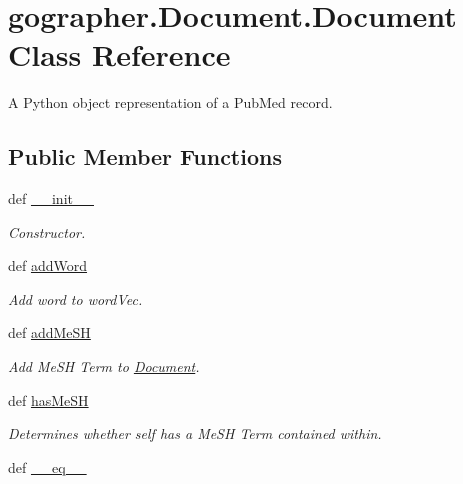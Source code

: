 \hypertarget{classgographer_1_1_document_1_1_document}{\section{gographer.\-Document.\-Document Class Reference}
\label{classgographer_1_1_document_1_1_document}
}


A Python object representation of a Pub\-Med record.  


\subsection*{Public Member Functions}
\begin{DoxyCompactItemize}
\item 
\hypertarget{classgographer_1_1_document_1_1_document_a2fd79ed107c0c6a191dc80dd51fe75f6}{def \hyperlink{classgographer_1_1_document_1_1_document_a2fd79ed107c0c6a191dc80dd51fe75f6}{\-\_\-\-\_\-init\-\_\-\-\_\-}}\label{classgographer_1_1_document_1_1_document_a2fd79ed107c0c6a191dc80dd51fe75f6}

\begin{DoxyCompactList}\small\item\em Constructor. \end{DoxyCompactList}\item 
def \hyperlink{classgographer_1_1_document_1_1_document_ac9d11f856218c07cda99bf2359b27ad2}{add\-Word}
\begin{DoxyCompactList}\small\item\em Add word to word\-Vec. \end{DoxyCompactList}\item 
def \hyperlink{classgographer_1_1_document_1_1_document_a889b1121d2341a508bbf7230c48267fd}{add\-Me\-S\-H}
\begin{DoxyCompactList}\small\item\em Add Me\-S\-H Term to \hyperlink{classgographer_1_1_document_1_1_document}{Document}. \end{DoxyCompactList}\item 
\hypertarget{classgographer_1_1_document_1_1_document_a6a75e7d644e2a18f23a79d5cb31451d1}{def \hyperlink{classgographer_1_1_document_1_1_document_a6a75e7d644e2a18f23a79d5cb31451d1}{has\-Me\-S\-H}}\label{classgographer_1_1_document_1_1_document_a6a75e7d644e2a18f23a79d5cb31451d1}

\begin{DoxyCompactList}\small\item\em Determines whether self has a Me\-S\-H Term contained within. \end{DoxyCompactList}\item 
\hypertarget{classgographer_1_1_document_1_1_document_a389cb58d2ec62dc83a9f2f6ecc5fb484}{def \hyperlink{classgographer_1_1_document_1_1_document_a389cb58d2ec62dc83a9f2f6ecc5fb484}{\-\_\-\-\_\-eq\-\_\-\-\_\-}}\label{classgographer_1_1_document_1_1_document_a389cb58d2ec62dc83a9f2f6ecc5fb484}


\end{DoxyCompactItemize}
